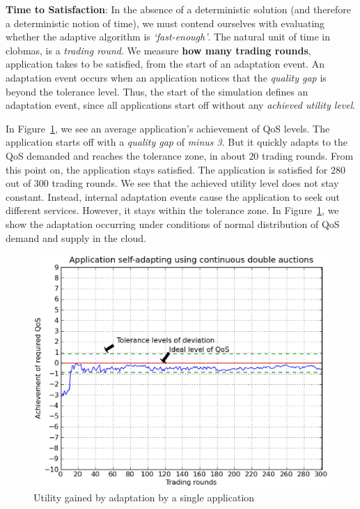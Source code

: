 \documentclass[10pt,journal,compsoc]{IEEEtran}
\begin{document}
\textbf{Time to Satisfaction}: In the absence of a deterministic solution (and therefore a deterministic notion of time), we must contend ourselves with evaluating whether the adaptive algorithm is \textit{`fast-enough'}.  The natural unit of time in clobmas, is a \textit{trading round}.  We measure \textbf{how many trading rounds}, application takes to be satisfied, from the start of an adaptation event. An adaptation event occurs when an application notices that the \textit{quality gap} is beyond the tolerance level. Thus, the start of the simulation defines an adaptation event, since all applications start off without any \textit{achieved utility level}.
	
In Figure~\ref{fig:goodness_cda}, we see an average application's achievement of QoS levels. The application starts off with a \textit{quality gap} of \textit{minus 3}. But it quickly adapts to the QoS demanded and reaches the tolerance zone, in about $20$ trading rounds. From this point on, the application stays satisfied. The application is satisfied for $280$ out of $300$ trading rounds. We see that the achieved utility level does not stay constant. Instead, internal adaptation events cause the application to seek out different services. However, it stays within the tolerance zone. In Figure~\ref{fig:goodness_cda}, we show the adaptation occurring  under conditions of normal distribution of QoS demand and supply in the cloud. 
 \begin{figure}[h]
 	\centering
    \includegraphics[scale=0.45]{Figure7.eps}
    \caption{Utility gained by adaptation by a single application \label{fig:goodness_cda}}
\end{figure}	 
\end{document}
